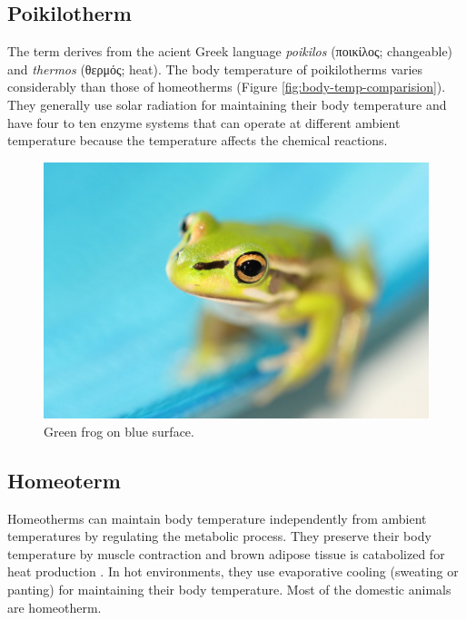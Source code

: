 \documentclass[]{book}
\begin{document}
\hypertarget{poikilotherm}{%
\subsection{Poikilotherm}\label{poikilotherm}}

The term derives from the acient Greek language \emph{poikilos} (ποικίλος; changeable) and \emph{thermos} (θερμός; heat). The body temperature of poikilotherms varies considerably than those of homeotherms (Figure \ref{fig:body-temp-comparision}). They generally use solar radiation for maintaining their body temperature and have four to ten enzyme systems that can operate at different ambient temperature because the temperature affects the chemical reactions.

\begin{figure}

{\centering \includegraphics[width=1\linewidth]{figures/flog} 

}

\caption{Green frog on blue surface.}\label{fig:flor}
\end{figure}

\hypertarget{homeoterm}{%
\subsection{Homeoterm}\label{homeoterm}}

Homeotherms can maintain body temperature independently from ambient temperatures by regulating the metabolic process. They preserve their body temperature by muscle contraction and brown adipose tissue is catabolized for heat production \citep{grigg2004evolution}. In hot environments, they use evaporative cooling (sweating or panting) for maintaining their body temperature. Most of the domestic animals are homeotherm.
\end{document}
